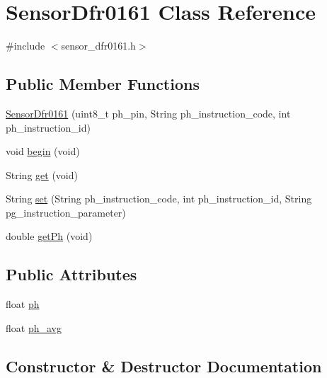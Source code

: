 \hypertarget{class_sensor_dfr0161}{}\section{Sensor\+Dfr0161 Class Reference}
\label{class_sensor_dfr0161}


{\ttfamily \#include $<$sensor\+\_\+dfr0161.\+h$>$}

\subsection*{Public Member Functions}
\begin{DoxyCompactItemize}
\item 
\hyperlink{class_sensor_dfr0161_a2610eb178b9cd0c2e00738df72863e8b}{Sensor\+Dfr0161} (uint8\+\_\+t ph\+\_\+pin, String ph\+\_\+instruction\+\_\+code, int ph\+\_\+instruction\+\_\+id)
\item 
void \hyperlink{class_sensor_dfr0161_aee10a8faa4f752486a3a14662ba70d2d}{begin} (void)
\item 
String \hyperlink{class_sensor_dfr0161_a85017ddaf1e4ef3c09ea77fd0625e691}{get} (void)
\item 
String \hyperlink{class_sensor_dfr0161_a072cbfa3e18f9e5dd7b2faeec20721c3}{set} (String ph\+\_\+instruction\+\_\+code, int ph\+\_\+instruction\+\_\+id, String pg\+\_\+instruction\+\_\+parameter)
\item 
double \hyperlink{class_sensor_dfr0161_a659010048f28fd711b98a29b7825486f}{get\+Ph} (void)
\end{DoxyCompactItemize}
\subsection*{Public Attributes}
\begin{DoxyCompactItemize}
\item 
float \hyperlink{class_sensor_dfr0161_a98640420a5bd5b7461341893c1a8633b}{ph}
\item 
float \hyperlink{class_sensor_dfr0161_a84060ac1d68a19d8cbc7505484c31391}{ph\+\_\+avg}
\end{DoxyCompactItemize}


\subsection{Constructor \& Destructor Documentation}
\hypertarget{class_sensor_dfr0161_a2610eb178b9cd0c2e00738df72863e8b}{}
